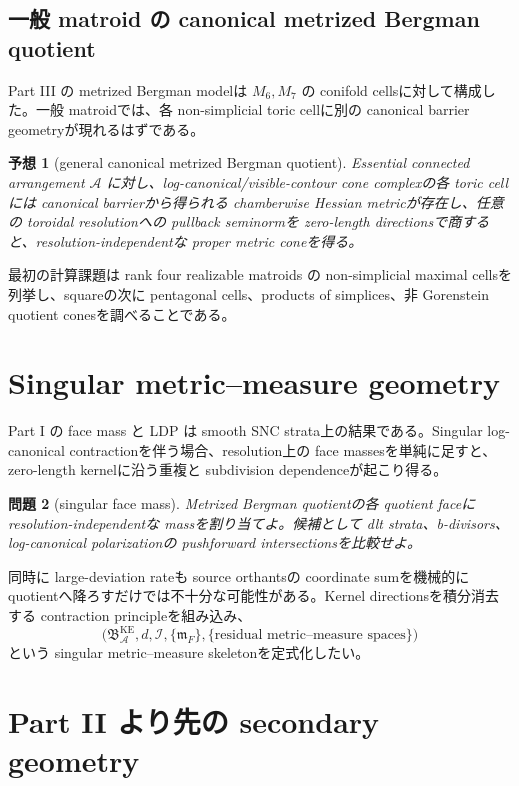 \documentclass[11pt,a4paper]{ltjsarticle}
\newcommand{\cA}{\mathcal A}\newcommand{\cH}{\mathcal H}\newcommand{\cL}{\mathcal L}
\theoremstyle{plain}
\newtheorem{conjecture}{予想}[section]
\newtheorem{problem}[conjecture]{問題}
\theoremstyle{definition}
\theoremstyle{remark}
\begin{document}
\subsection{一般 matroid の canonical metrized Bergman quotient}

Part III の metrized Bergman modelは $M_6,M_7$ の conifold cellsに対して構成した。一般 matroidでは、各 non-simplicial toric cellに別の canonical barrier geometryが現れるはずである。

\begin{conjecture}[general canonical metrized Bergman quotient]\label{conj:general-bergman-v22}
Essential connected arrangement $\cA$ に対し、log-canonical/visible-contour cone complexの各 toric cellには canonical barrierから得られる chamberwise Hessian metricが存在し、任意の toroidal resolutionへの pullback seminormを zero-length directionsで商すると、resolution-independentな proper metric coneを得る。
\end{conjecture}

最初の計算課題は rank four realizable matroids の non-simplicial maximal cellsを列挙し、squareの次に pentagonal cells、products of simplices、非 Gorenstein quotient conesを調べることである。

\section{Singular metric--measure geometry}

Part I の face mass と LDP は smooth SNC strata上の結果である。Singular log-canonical contractionを伴う場合、resolution上の face massesを単純に足すと、zero-length kernelに沿う重複と subdivision dependenceが起こり得る。

\begin{problem}[singular face mass]\label{prob:singular-face-mass-v22}
Metrized Bergman quotientの各 quotient faceに resolution-independentな massを割り当てよ。候補として dlt strata、b-divisors、log-canonical polarizationの pushforward intersectionsを比較せよ。
\end{problem}

同時に large-deviation rateも source orthantsの coordinate sumを機械的に quotientへ降ろすだけでは不十分な可能性がある。Kernel directionsを積分消去する contraction principleを組み込み、
\[
 \bigl(\mathfrak B_\cA^{\mathrm{KE}},d,\mathcal I,
       \{\mathfrak m_F\},\{\text{residual metric--measure spaces}\}\bigr)
\]
という singular metric--measure skeletonを定式化したい。

\section{Part II より先の secondary geometry}
\end{document}
